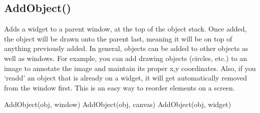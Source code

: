 \documentclass[letterpaper,10pt,english]{sphinxmanual}
\begin{document}
\ignorespaces 

\subsection{AddObject()}
\label{\detokenize{reference/peblobjects:addobject}}\label{\detokenize{reference/peblobjects:index-0}}
\sphinxAtStartPar
{}

\sphinxAtStartPar
{}

\sphinxAtStartPar
Adds a widget to a parent window, at the top of the object stack.  Once added, the object will be drawn onto the parent last, meaning it will be on top of anything previously added.   In general, objects can be added to other objects as well as windows.  For example, you can add drawing objects (circles, etc.) to an image to annotate the image and maintain its proper x,y coordinates.  Also, if you ‘re\sphinxhyphen{}add’ an object that is already on a widget, it will get automatically removed from the window first.  This is an easy way to reorder elements on a screen.

\begin{sphinxVerbatim}[commandchars=\\\{\}]
AddObject(\PYGZlt{}obj\PYGZgt{}, \PYGZlt{}window\PYGZgt{}) AddObject(\PYGZlt{}obj\PYGZgt{}, \PYGZlt{}canvas\PYGZgt{}) AddObject(\PYGZlt{}obj\PYGZgt{}, \PYGZlt{}widget\PYGZgt{})
\end{sphinxVerbatim}

\sphinxAtStartPar
{}

\begin{sphinxVerbatim}[commandchars=\\\{\}]
\end{sphinxVerbatim}
\end{document}
